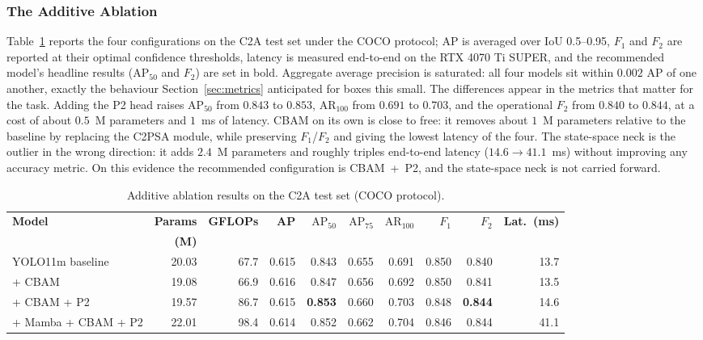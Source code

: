 \subsubsection{The Additive Ablation}
Table~\ref{tab:main} reports the four configurations on the C2A test set
under the COCO protocol; AP is averaged over IoU 0.5--0.95, $F_1$ and $F_2$
are reported at their optimal confidence thresholds, latency is measured
end-to-end on the RTX 4070 Ti SUPER, and the recommended model's headline
results ($\mathrm{AP}_{50}$ and $F_2$) are set in bold. Aggregate average
precision is saturated: all
four models sit within $0.002$ AP of one another, exactly the behaviour
Section~\ref{sec:metrics} anticipated for boxes this small. The differences
appear in the metrics that matter for the task. Adding the P2 head raises
$\mathrm{AP}_{50}$ from $0.843$ to $0.853$, $\mathrm{AR}_{100}$ from $0.691$
to $0.703$, and the operational $F_2$ from $0.840$ to $0.844$, at a cost of
about $0.5$~M parameters and $1$~ms of latency. CBAM on its own is close to
free: it removes about $1$~M parameters relative to the baseline by replacing
the C2PSA module, while preserving $F_1$/$F_2$ and giving the lowest latency
of the four. The state-space neck
is the outlier in the wrong direction: it adds $2.4$~M parameters and
roughly triples end-to-end latency ($14.6 \to 41.1$~ms) without improving
any accuracy metric. On this evidence the recommended configuration is
CBAM~+~P2, and the state-space neck is not carried forward.

\begin{table}[tbp]
  \centering
  \caption{Additive ablation results on the C2A test set (COCO protocol).}
  \label{tab:main}
  \small
  \setlength{\tabcolsep}{3pt}
  \begin{tabular}{@{}l r r r r r r r r r@{}}
    \toprule
    \bfseries\boldmath Model& \bfseries\boldmath Params& \bfseries\boldmath GFLOPs& \bfseries\boldmath AP& \bfseries\boldmath $\mathrm{AP}_{50}$& \bfseries\boldmath $\mathrm{AP}_{75}$& \bfseries\boldmath $\mathrm{AR}_{100}$& \bfseries\boldmath $F_1$& \bfseries\boldmath $F_2$& \bfseries\boldmath Lat.\ (ms)\\
    & \bfseries\boldmath (M)& & & & & & & & \\
    \midrule
    YOLO11m baseline    & 20.03 & 67.7 & 0.615 & 0.843 & 0.655 & 0.691 & 0.850 & 0.840 & 13.7 \\
    + CBAM              & 19.08 & 66.9 & 0.616 & 0.847 & 0.656 & 0.692 & 0.850 & 0.841 & 13.5 \\
    + CBAM + P2         & 19.57 & 86.7 & 0.615 & \textbf{0.853} & 0.660 & 0.703 & 0.848 & \textbf{0.844} & 14.6 \\
    + Mamba + CBAM + P2 & 22.01 & 98.4 & 0.614 & 0.852 & 0.662 & 0.704 & 0.846 & 0.844 & 41.1 \\
    \bottomrule
  \end{tabular}
\end{table}


